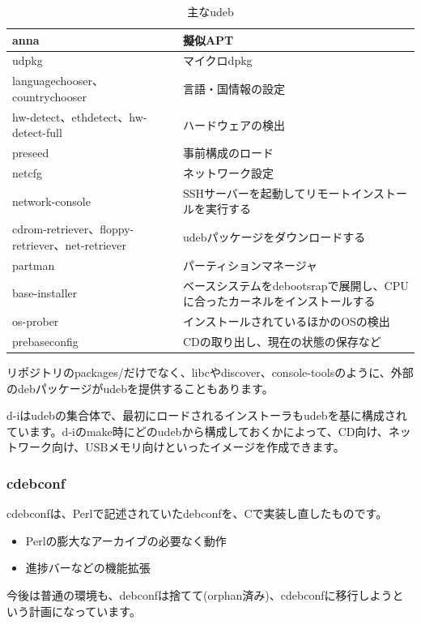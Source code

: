 \documentclass[mingoth,a4paper]{jsarticle}
\begin{document}
\begin{table}[htbp]
  \begin{tabular}[htbp]{|l|p{7cm}|}\hline
    anna&擬似APT\\ \hline
    udpkg&マイクロdpkg\\ \hline
    languagechooser、countrychooser&言語・国情報の設定\\ \hline
    hw-detect、ethdetect、hw-detect-full&ハードウェアの検出\\ \hline
    preseed&事前構成のロード\\ \hline
    netcfg&ネットワーク設定\\ \hline
    network-console&SSHサーバーを起動してリモートインストールを実行する\\ \hline
    cdrom-retriever、floppy-retriever、net-retriever&udebパッケージをダウンロードする\\ \hline
    partman&パーティションマネージャ\\ \hline
    base-installer&ベースシステムをdebootsrapで展開し、CPUに合ったカーネルをインストールする\\ \hline
    os-prober&インストールされているほかのOSの検出\\ \hline
    prebaseconfig&CDの取り出し、現在の状態の保存など\\ \hline
  \end{tabular}
  \caption{主なudeb}
  \label{tab:udeb}
\end{table}

リポジトリのpackages/だけでなく、libcやdiscover、console-toolsのように、外部のdebパッケージがudebを提供することもあります。

d-iはudebの集合体で、最初にロードされるインストーラもudebを基に構成されています。d-iのmake時にどのudebから構成しておくかによって、CD向け、ネットワーク向け、USBメモリ向けといったイメージを作成できます。


\subsubsection{cdebconf}
\label{sec:cdebconf}

cdebconfは、Perlで記述されていたdebconfを、Cで実装し直したものです。

\begin{itemize}
\item Perlの膨大なアーカイブの必要なく動作
\item 進捗バーなどの機能拡張
\end{itemize}

今後は普通の環境も、debconfは捨てて(orphan済み)、cdebconfに移行しようという計画になっています。
\end{document}
